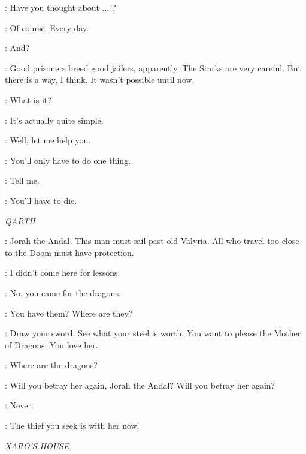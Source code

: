 \ALTON: Have you thought about $\ldots$ ?

\JAIME: Of course. Every day.

\ALTON: And?

\JAIME: Good prisoners breed good jailers, apparently. The Starks are very careful. But there is a way, I think. It wasn't possible until now.

\ALTON: What is it?

\JAIME: It's actually quite simple.

\ALTON: Well, let me help you.

\JAIME: You'll only have to do one thing.

\ALTON: Tell me.

\JAIME:  You'll have to die.




\scene

\textit{QARTH}


\QUAITHE: Jorah the Andal. This man must sail past old Valyria. All who travel too close to the Doom must have protection.

\JORAH: I didn't come here for lessons.

\QUAITHE: No, you came for the dragons.

\JORAH: You have them? Where are they?


\QUAITHE: Draw your sword. See what your steel is worth. You want to please the Mother of Dragons. You love her.

\JORAH: Where are the dragons?

\QUAITHE: Will you betray her again, Jorah the Andal? Will you betray her again?

\JORAH: Never.

\QUAITHE: The thief you seek is with her now.


\scene

\textit{XARO'S HOUSE}


